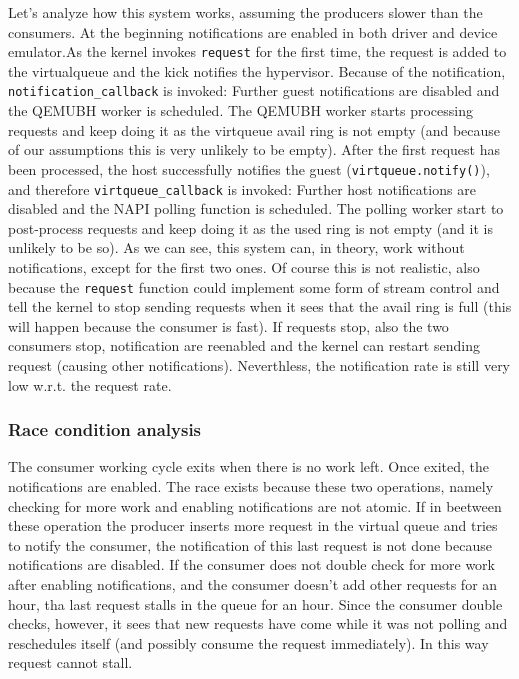 \vspace{0.5cm}

Let's analyze how this system works, assuming the producers slower than the consumers. At the beginning notifications are 
enabled in both driver and device emulator.As the kernel invokes \texttt{request} for the first time, the request is added to the 
virtualqueue and the kick notifies the hypervisor. Because of the
notification, \texttt{notification\_callback} is invoked: Further guest notifications are disabled and the QEMUBH worker is
scheduled. The QEMUBH worker starts processing requests and keep doing it as the virtqueue avail ring is not empty (and because of our 
assumptions this is very unlikely to be empty). After the first request has been processed, the host successfully notifies the guest 
(\texttt{virtqueue.notify()}), and therefore \texttt{virtqueue\_callback} is invoked: Further host notifications are disabled and the
NAPI polling function is scheduled. The polling worker start to post-process requests and keep doing it as the used ring is not empty 
(and it is unlikely to be so). As we can see, this system can, in theory, work without notifications, except for the first two ones.
Of course this is not realistic, also because the \texttt{request} function could implement some form of stream control and tell the kernel
to stop sending requests when it sees that the avail ring is full (this will happen because the consumer is fast). If requests stop, also
the two consumers stop, notification are reenabled and the kernel can restart sending request (causing other notifications).
Neverthless, the notification rate is still very low w.r.t. the request rate.


\subsubsection{Race condition analysis}
The consumer working cycle exits when there is no work left. Once exited, the notifications are enabled. The race exists because these
two operations, namely checking for more work and enabling notifications are not atomic. If in beetween these operation the producer
inserts more request in the virtual queue and tries to notify the consumer, the notification of this last request is not done because 
notifications are disabled. If the consumer does not double check for more work after enabling notifications, and the consumer doesn't
add other requests for an hour, tha last request stalls in the queue for an hour. Since the consumer double checks, however, it sees
that new requests have come while it was not polling and reschedules itself (and possibly consume the request immediately). In this
way request cannot stall.

